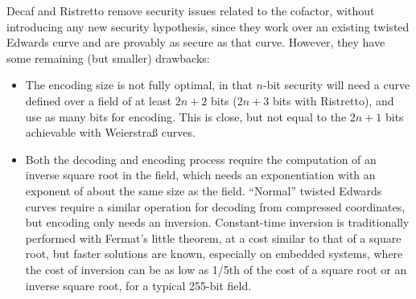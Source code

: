\documentclass{llncs}
\begin{document}
Decaf and Ristretto remove security issues related to the cofactor,
without introducing any new security hypothesis, since they work over an
existing twisted Edwards curve and are provably as secure as that curve.
However, they have some remaining (but smaller) drawbacks:
\begin{itemize}

    \item The encoding size is not fully optimal, in that $n$-bit
    security will need a curve defined over a field of at least $2n+2$
    bits ($2n+3$ bits with Ristretto), and use as many bits for
    encoding. This is close, but not equal to the $2n+1$ bits
    achievable with Weierstraß curves.

    \item Both the decoding and encoding process require the computation
    of an inverse square root in the field, which needs an
    exponentiation with an exponent of about the same size as the field.
    ``Normal'' twisted Edwards curves require a similar operation for
    decoding from compressed coordinates, but encoding only needs an
    inversion. Constant-time inversion is traditionally performed with
    Fermat's little theorem, at a cost similar to that of a square root,
    but faster solutions are known\cite{Por2020-3}, especially on
    embedded systems, where the cost of inversion can be as low as 1/5th
    of the cost of a square root or an inverse square root, for a
    typical 255-bit field\cite{Por2020-4}.

\end{itemize}
\end{document}
